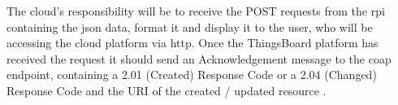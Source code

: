 The cloud's responsibility will be to receive the POST requests from the 
\gls{rpi} containing the \gls{json} data, format it and display it 
to the user, who will be accessing the cloud platform via \gls{http}. 
Once the ThingsBoard platform has received the request it should send an 
Acknowledgement message to the \gls{coap} endpoint, 
containing a 2.01 (Created) Response Code or a 2.04 (Changed) Response Code 
and the URI of the created / updated resource \citep{shelby_constrained_2014}. 